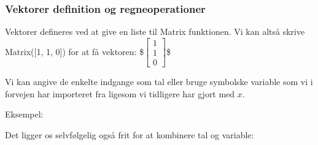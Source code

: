 \documentclass[letterpaper,10pt,english]{jupyterBook}
\begin{document}
\subsubsection{Vektorer \sphinxhyphen{} definition og regneoperationer}
\label{\detokenize{notebooks/sympy/Notebook_LinAlg1:vektorer-definition-og-regneoperationer}}
Vektorer defineres ved at give en liste til Matrix funktionen. Vi kan altså skrive Matrix({[}1, 1, 0{]}) for at få vektoren:
\$\(\displaystyle \left[\begin{matrix}1\\1\\0\end{matrix}\right]\)\$

Vi kan angive de enkelte indgange som tal eller bruge symbolske variable som vi i forvejen har importeret fra  ligesom vi tidligere har gjort med \(x\).

Eksempel:

\begin{sphinxVerbatim}[commandchars=\\\{\}]
   
     

  \PYG{p}{[}  \PYG{p}{]}
\end{sphinxVerbatim}

\noindent{}

Det ligger os selvfølgelig også frit for at kombinere tal og variable:

\begin{sphinxVerbatim}[commandchars=\\\{\}]
  \PYG{p}{[}       \PYG{p}{]}   
\end{sphinxVerbatim}

\noindent{}
\end{document}
